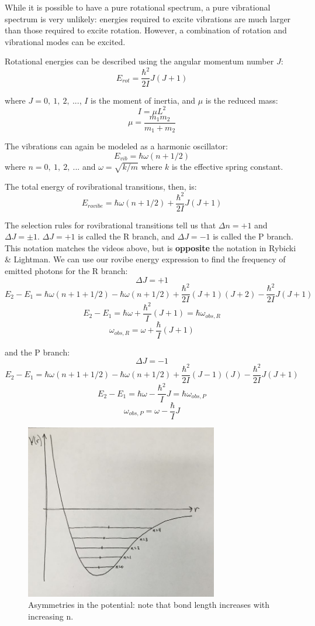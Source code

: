 \documentclass{article}
\begin{document}
While it is possible to have a pure rotational spectrum, a pure vibrational spectrum is very unlikely: energies required to excite vibrations are much larger than those required to excite rotation. However, a combination of rotation and vibrational modes can be excited. 

Rotational energies can be described using the angular momentum number $J$:
$$E_{rot} = \frac{\hbar^2}{2I} J (J+1) $$

where $J = 0,\ 1,\ 2,\ ...$, $I$ is the moment of inertia, and $\mu$ is the reduced mass:
$$ I = \mu L^2 $$
$$ \mu = \frac{m_1 m_2}{m_1 + m_2} $$

The vibrations can again be modeled as a harmonic oscillator:
$$ E_{vib} = \hbar \omega (n + 1/2) $$
where $n = 0,\ 1,\ 2,\ ...$ and $\omega = \sqrt{k/m}$ where $k$ is the effective spring constant.

The total energy of rovibrational transitions, then, is:
$$ E_{rovibe} = \hbar \omega (n+1/2) + \frac{\hbar^2}{2I} J (J+1) $$

The selection rules for rovibrational transitions tell us that $\Delta n = +1$ and $\Delta J = \pm 1$. $\Delta J = +1$ is called the R branch, and $\Delta J = -1$ is called the P branch. This notation matches the videos above, but is {\bf opposite} the notation in Rybicki \& Lightman. We can use our rovibe energy expression to find the frequency of emitted photons for the R branch:
$$ \Delta J = +1 $$
$$ E_2 - E_1 = \hbar \omega (n+1 + 1/2) - \hbar \omega (n + 1/2) + \frac{\hbar^2}{2I} (J+1)(J+2) - \frac{\hbar^2}{2I} J (J+1) $$
$$ E_2 - E_1 = \hbar \omega + \frac{\hbar^2}{I} (J+1) = \hbar \omega_{obs, R} $$
$$ \omega_{obs, R} = \omega + \frac{\hbar}{I} (J+1) $$

and the P branch:
$$ \Delta J = -1 $$
$$ E_2 - E_1 = \hbar \omega (n+1 + 1/2) - \hbar \omega (n + 1/2) + \frac{\hbar^2}{2I} (J-1)(J) - \frac{\hbar^2}{2I} J (J+1) $$
$$ E_2 - E_1 = \hbar \omega - \frac{\hbar^2}{I} J = \hbar \omega_{obs, P} $$
$$ \omega_{obs, P} = \omega - \frac{\hbar}{I} J $$


\begin{figure}[ht]
    \centering
    \includegraphics[width=0.75\textwidth]{659px-Asymm.jpg}
    \caption{Asymmetries in the potential: note that bond length increases with increasing n.}
    \label{fig:asymm}
\end{figure}
\end{document}
